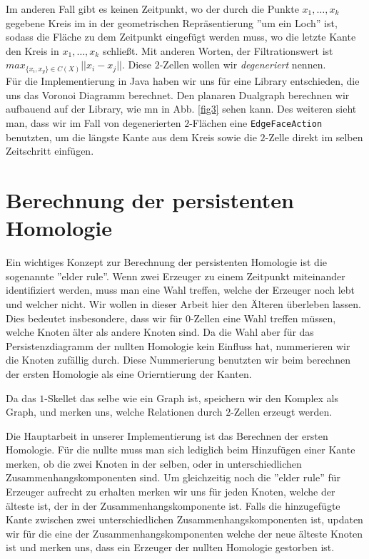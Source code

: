 \documentclass[11pt, a4paper,draft]{report}
\begin{document}
 	Im anderen Fall gibt es keinen Zeitpunkt, wo der durch die Punkte $x_1,\ldots,x_k$ gegebene Kreis
 	im in der geometrischen Repräsentierung ''um ein Loch'' ist, sodass die Fläche zu dem Zeitpunkt eingefügt werden muss, wo die letzte Kante den Kreis in $x_1,\ldots,x_k$ schließt. Mit anderen Worten, der Filtrationswert ist $max_{\{x_i,x_y\}\in C(X)}||x_i-x_j||$. Diese $2$-Zellen wollen wir \textit{degeneriert} nennen.\\
 	Für die Implementierung in Java haben wir uns für eine Library entschieden, die uns das Voronoi Diagramm berechnet. Den planaren Dualgraph berechnen wir aufbauend auf der Library, wie mn in Abb. \ref{fig3} sehen kann. Des weiteren sieht man, dass wir im Fall von degenerierten $2$-Flächen eine \texttt{EdgeFaceAction} benutzten, um die längste Kante aus dem Kreis sowie die $2$-Zelle direkt im selben Zeitschritt einfügen.
 	
 	\section{Berechnung der persistenten Homologie}
 	
 	Ein wichtiges Konzept zur Berechnung der persistenten Homologie ist die sogenannte ''elder rule''. Wenn zwei Erzeuger zu einem Zeitpunkt miteinander identifiziert werden, muss man eine Wahl treffen, welche der Erzeuger noch lebt und welcher nicht. Wir wollen in dieser Arbeit hier den Älteren überleben lassen. Dies bedeutet insbesondere, dass wir für $0$-Zellen eine Wahl treffen müssen, welche Knoten älter als andere Knoten sind. Da die Wahl aber für das Persistenzdiagramm der nullten Homologie kein Einfluss hat, nummerieren wir die Knoten zufällig durch. Diese Nummerierung benutzten wir beim berechnen der ersten Homologie als eine Orierntierung der Kanten. 
 	
 	Da das $1$-Skellet das selbe wie ein Graph ist, speichern wir den Komplex als Graph, und merken uns, welche Relationen durch $2$-Zellen erzeugt werden.
 	
 	Die Hauptarbeit in unserer Implementierung ist das Berechnen der ersten Homologie. Für die nullte muss man sich lediglich beim Hinzufügen einer Kante merken, ob die zwei Knoten in der selben, oder in unterschiedlichen Zusammenhangskomponenten sind. Um gleichzeitig noch die ''elder rule'' für Erzeuger aufrecht zu erhalten merken wir uns für jeden Knoten, welche der älteste ist, der in der Zusammenhangskomponente ist. Falls die hinzugefügte Kante zwischen zwei unterschiedlichen Zusammenhangskomponenten ist, updaten wir für die eine der Zusammenhangskomponenten welche der neue älteste Knoten ist und merken uns, dass ein Erzeuger der nullten Homologie gestorben ist.
 	
\end{document}
